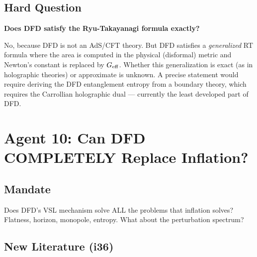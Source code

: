 \documentclass[11pt,a4paper]{article}
\begin{document}
\subsection{Hard Question}

\textbf{Does DFD satisfy the Ryu-Takayanagi formula exactly?}

No, because DFD is not an AdS/CFT theory. But DFD satisfies a \emph{generalized} RT formula where the area is computed in the physical (disformal) metric and Newton's constant is replaced by $G_{\rm eff}$. Whether this generalization is exact (as in holographic theories) or approximate is unknown. A precise statement would require deriving the DFD entanglement entropy from a boundary theory, which requires the Carrollian holographic dual --- currently the least developed part of DFD.

\newpage
\section{Agent 10: Can DFD COMPLETELY Replace Inflation?}
\label{sec:agent10}

\subsection{Mandate}

Does DFD's VSL mechanism solve ALL the problems that inflation solves? Flatness, horizon, monopole, entropy. What about the perturbation spectrum?

\subsection{New Literature (i36)}
\end{document}
